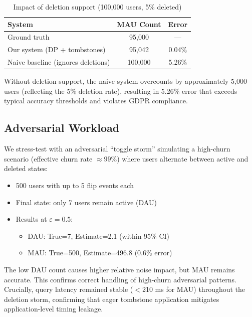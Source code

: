 \documentclass[sigconf,anonymous,review]{acmart}
\begin{document}
\begin{table}[H]
    \centering
    \caption{Impact of deletion support (100,000 users, 5\% deleted)}
    \label{tab:baseline}
    \begin{tabular}{lcc}
        \toprule
        \textbf{System}                    & \textbf{MAU Count} & \textbf{Error} \\
        \midrule
        Ground truth                       & 95,000             & ---            \\
        Our system (DP + tombstones)       & 95,042             & 0.04\%         \\
        Naive baseline (ignores deletions) & 100,000            & 5.26\%         \\
        \bottomrule
    \end{tabular}
\end{table}

Without deletion support, the naive system overcounts by approximately 5,000 users (reflecting the 5\% deletion rate), resulting in 5.26\% error that exceeds typical accuracy thresholds and violates GDPR compliance.

\subsection{Adversarial Workload}

We stress-test with an adversarial ``toggle storm'' simulating a high-churn scenario (effective churn rate $\approx 99\%$) where users alternate between active and deleted states:

\begin{itemize}
    \item 500 users with up to 5 flip events each
    \item Final state: only 7 users remain active (DAU)
    \item Results at $\varepsilon = 0.5$:
          \begin{itemize}
              \item DAU: True=7, Estimate=2.1 (within 95\% CI)
              \item MAU: True=500, Estimate=496.8 (0.6\% error)
          \end{itemize}
\end{itemize}

The low DAU count causes higher relative noise impact, but MAU remains accurate. This confirms correct handling of high-churn adversarial patterns. Crucially, query latency remained stable ($<$210 ms for MAU) throughout the deletion storm, confirming that eager tombstone application mitigates application-level timing leakage.
\end{document}
